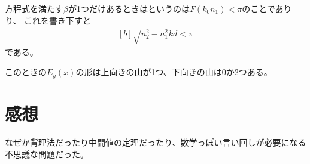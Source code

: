 \documentclass[../ap_2013.tex]{subfiles}
\begin{document}
方程式を満たす\(\beta\)が1つだけあるときはというのは\(F(k_0n_1)<\pi\)のことでありり、
これを書き下すと
\begin{equation}\begin{aligned}[b]
    \sqrt{n_2^2-n_1^2}kd<\pi
\end{aligned}\end{equation}
である。

このときの\(E_y(x)\)の形は上向きの山が1つ、下向きの山は0か2つある。

\section*{感想}
なぜか背理法だったり中間値の定理だったり、数学っぽい言い回しが必要になる不思議な問題だった。
\end{document}
